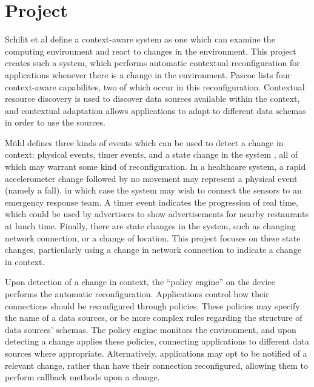 \documentclass[12pt,twoside,notitlepage]{report}
\begin{document}
\section{Project}

Schilit et al \cite{Schilit:1994:CCA:1439278.1440041}  define a context-aware system as one which can examine the computing environment and react to changes in the environment. 
This project creates such a system, which performs automatic contextual reconfiguration for applications whenever there is a change in the environment. 
Pascoe \cite{Pascoe:1998:AGC:857199.858020} lists four context-aware capabilites, two of which occur in this reconfiguration. 
Contextual resource discovery is used to discover data sources available within the context, and contextual adaptation allows applications to adapt to different data schemas in order to use the sources. 

M\"{u}hl defines three kinds of events which can be used to detect a change in context: physical events, timer events, and a state change in the system \cite[page 11]{Muhl:2006:DES:1162246}, all of which may warrant some kind of reconfiguration. 
In a healthcare system, a rapid accelerometer change followed by no movement may represent a physical event (namely a fall), in which case the system may wish to connect the sensors to an emergency response team.
A timer event indicates the progression of real time, which could be used by advertisers to show advertisements for nearby restaurants at lunch time. 
Finally, there are state changes in the system, such as changing network connection, or a change of location. 
This project focuses on these state changes, particularly using a change in network connection to indicate a change in context. 

Upon detection of a change in context, the ``policy engine'' on the device performs the automatic reconfiguration. 
Applications control how their connections should be reconfigured through policies. 
These policies may specify the name of a data sources, or be more complex rules regarding the structure of data sources' schemas. 
The policy engine monitors the environment, and upon detecting a change applies these policies, connecting applications to different data sources where appropriate.
Alternatively, applications may opt to be notified of a relevant change, rather than have their connection reconfigured, allowing them to perform callback methods upon a change.
\end{document}
